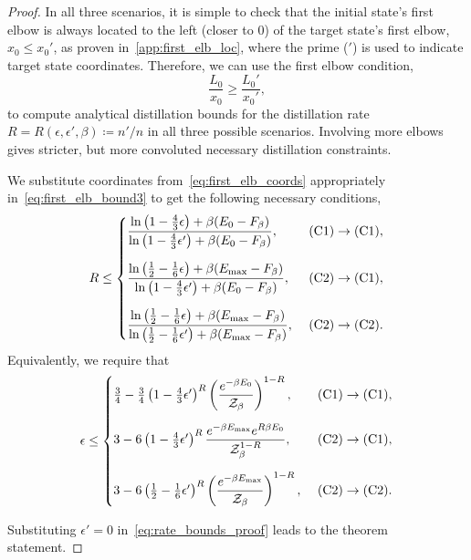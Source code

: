 \documentclass[pra,
aps,
twocolumn,
superscriptaddress,
groupedaddress,
nofootinbib,
reprint
]{revtex4-1}
\begin{document}
\begin{proof}
In all three scenarios, it is simple to check that the initial state's first elbow is always located to the left (closer to $0$) of the target state's first elbow, $x_0 \leq x_0'$, as proven in~\cref{app:first_elb_loc}, where the prime ($'$) is used to indicate target state coordinates.
Therefore, we can use the first elbow condition,
\begin{equation}\label{eq:first_elb_bound3}
	\frac{L_0}{x_0} \geq \frac{L_0'}{x_0'},
\end{equation}
to compute analytical distillation bounds for the distillation rate $R = R(\epsilon, \epsilon', \beta) \coloneqq n'/n$ in all three possible scenarios.
Involving more elbows gives stricter, but more convoluted necessary distillation constraints.

We substitute coordinates from~\cref{eq:first_elb_coords} appropriately in~\cref{eq:first_elb_bound3} to get the following necessary conditions,
\begin{equation}\label{eq:rate_bounds_proof}
	R \leq
	\begin{cases}
		\dfrac{\ln{\big( 1-\frac{4}{3}\epsilon \big)} + \beta (E_0 - F_\beta)}{\ln{\big( 1-\frac{4}{3}\epsilon' \big)} + \beta (E_0 - F_\beta)},\ &\rm{(C1)} \rightarrow \rm{(C1)}, \vspace{10pt}\\
		\dfrac{\ln{\big( \frac{1}{2}-\frac{1}{6}\epsilon \big)} + \beta (E_{\rm{max}} - F_\beta)}{\ln{\big( 1-\frac{4}{3}\epsilon' \big)} + \beta (E_0 - F_\beta)},\ &\rm{(C2)} \rightarrow \rm{(C1)}, \vspace{10pt}\\
		\dfrac{\ln{\big( \frac{1}{2}-\frac{1}{6}\epsilon \big)} + \beta (E_{\rm{max}} - F_\beta)}{\ln{\big( \frac{1}{2}-\frac{1}{6}\epsilon' \big)} + \beta (E_{\rm{max}} - F_\beta)},\ &\rm{(C2)} \rightarrow \rm{(C2)}.
	\end{cases}
\end{equation}
Equivalently, we require that
\begin{equation}\label{eq:error_bounds_proof}
	\epsilon \leq
	\begin{cases}
		\frac{3}{4} - \frac{3}{4} \left( 1 - \frac{4}{3}\epsilon' \right)^{R} \left( \dfrac{e^{-\beta E_0}}{\Z_\beta} \right)^{1 - R},\ &\rm{(C1)} \rightarrow \rm{(C1)}, \vspace{10pt}\\
		3 - 6 \left( 1 - \frac{4}{3}\epsilon' \right)^{R} \dfrac{e^{-\beta E_{\rm{max}}} e^{R\beta E_0}}{\Z_\beta^{1-R}},\ &\rm{(C2)} \rightarrow \rm{(C1)}, \vspace{10pt}\\
		3 - 6 \left( \frac{1}{2} - \frac{1}{6}\epsilon' \right)^{R} \left( \dfrac{e^{-\beta E_{\rm{max}}}}{\Z_\beta} \right)^{1 - R},\ &\rm{(C2)} \rightarrow \rm{(C2)}.
	\end{cases}
\end{equation}

Substituting $\epsilon' = 0$ in~\cref{eq:rate_bounds_proof} leads to the theorem statement.

\end{proof}
\end{document}
